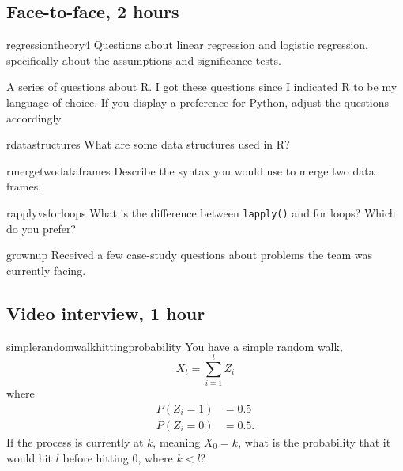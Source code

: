 \documentclass[a4paper]{article}
\begin{document}
\clearpage
\subsection{Face-to-face, 2 hours}
\begin{question}{regressiontheory4}
Questions about linear regression and logistic regression, specifically about the assumptions and significance tests.
\end{question}


\begin{questionwithnoanswer}
A series of questions about R.
I got these questions since I indicated R to be my language of choice.
If you display a preference for Python, adjust the questions accordingly.
\end{questionwithnoanswer}

\begin{subquestion}{rdatastructures}
What are some data structures used in R?
\end{subquestion}



\begin{subquestion}{rmergetwodataframes}
Describe the syntax you would use to merge two data frames.
\end{subquestion}



\begin{subquestion}{rapplyvsforloops}
What is the difference between \verb+lapply()+ and for loops?
Which do you prefer?
\end{subquestion}


\begin{question}{grownup}
Received a few case-study questions about problems the team was currently facing.
\end{question}

 \clearpage






\clearpage
\subsection{Video interview, 1 hour}
\begin{question}{simplerandomwalkhittingprobability}
You have a simple random walk,
\[
  X_t = \sum_{i=1}^{t}{Z_i}
\]
where
\begin{align*}
 P(Z_i = 1) &= 0.5 \\
 P(Z_i = 0) &= 0.5
 \text{.}
\end{align*}
If the process is currently at $k$, meaning $X_0=k$, what is the probability that it would hit $l$ before hitting $0$,
where $k < l$?
\end{question}
\end{document}
